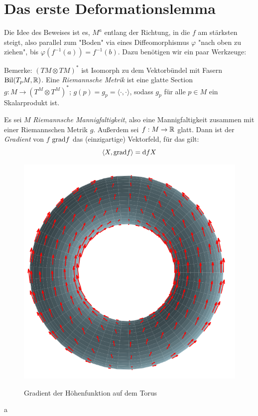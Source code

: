 \section{Das erste Deformationslemma}

Die Idee des Beweises ist es, $M^a$ entlang der Richtung, in die $f$ am stärksten
steigt, also parallel zum "Boden" via eines Diffeomorphismus $\varphi$ "nach oben 
zu ziehen", bis $\varphi(f^{-1}(a)) = f^{-1}(b)$. Dazu benötigen wir ein paar 
Werkzeuge:

\begin{definition}
    Bemerke: $( TM \otimes TM )^*$ ist Isomorph zu dem Vektorbündel mit Fasern 
    $\operatorname{Bil}(T_pM, { \mathbb R })$. Eine \textit{Riemannsche Metrik} ist eine glatte
    Section $g: M \to (T^M \otimes T^M)^*$; $g(p) = g_p = \langle \cdot, \cdot \rangle$, 
    sodass $g_p$ für alle $p \in M$ ein Skalarprodukt ist.
\end{definition}

\begin{definition}[Gradient]
    Es sei $M$ \textit{Riemannsche Mannigfaltigkeit}, also eine Mannigfaltigkeit
    zusammen mit einer Riemannschen Metrik $g$. Außerdem sei $f: M \to { \mathbb R }$ glatt.
    Dann ist der \textit{Gradient} von $f$ ${ \operatorname{grad} } f$ das (einzigartige) 
    Vektorfeld, für das gilt:
    \[ \langle X, { \operatorname{grad} } f \rangle = { \operatorname{d} } fX \]
\end{definition}

\begin{figure}[H]
    \centering
    \includegraphics[width=0.7\linewidth]{resources/Me-Diagram4-gradient-of-hightmapping.png}
    \label{fig:me-diagram4}
    \caption{Gradient der Höhenfunktion auf dem Torus}
\end{figure}a


